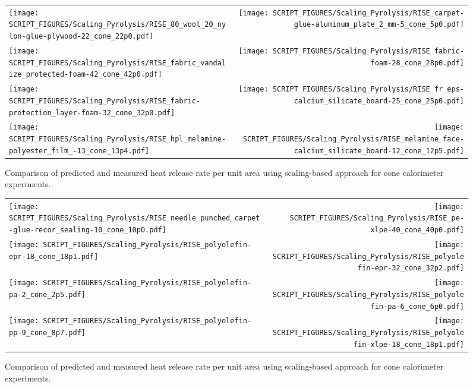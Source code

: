 \begin{figure}[p]
\begin{tabular*}{\textwidth}{l@{\extracolsep{\fill}}r}
\texttt{[image: SCRIPT\_FIGURES/Scaling\_Pyrolysis/RISE\_80\_wool\_20\_nylon-glue-plywood-22\_cone\_22p0.pdf]} &
\texttt{[image: SCRIPT\_FIGURES/Scaling\_Pyrolysis/RISE\_carpet-glue-aluminum\_plate\_2\_mm-5\_cone\_5p0.pdf]} \\
\texttt{[image: SCRIPT\_FIGURES/Scaling\_Pyrolysis/RISE\_fabric\_vandalize\_protected-foam-42\_cone\_42p0.pdf]} &
\texttt{[image: SCRIPT\_FIGURES/Scaling\_Pyrolysis/RISE\_fabric-foam-28\_cone\_28p0.pdf]} \\
\texttt{[image: SCRIPT\_FIGURES/Scaling\_Pyrolysis/RISE\_fabric-protection\_layer-foam-32\_cone\_32p0.pdf]} &
\texttt{[image: SCRIPT\_FIGURES/Scaling\_Pyrolysis/RISE\_fr\_eps-calcium\_silicate\_board-25\_cone\_25p0.pdf]} \\
\texttt{[image: SCRIPT\_FIGURES/Scaling\_Pyrolysis/RISE\_hpl\_melamine-polyester\_film\_-13\_cone\_13p4.pdf]} &
\texttt{[image: SCRIPT\_FIGURES/Scaling\_Pyrolysis/RISE\_melamine\_face-calcium\_silicate\_board-12\_cone\_12p5.pdf]} \\
\end{tabular*}
\caption[HRRPUA of RISE Materials using scaling model , Mixtures materials]
{Comparison of predicted and measured heat release rate per unit area using scaling-based approach for cone calorimeter experiments.}
\label{RISE_Materials_HRR_Mixtures}
\end{figure}

\begin{figure}[p]
\begin{tabular*}{\textwidth}{l@{\extracolsep{\fill}}r}
\texttt{[image: SCRIPT\_FIGURES/Scaling\_Pyrolysis/RISE\_needle\_punched\_carpet-glue-recor\_sealing-10\_cone\_10p0.pdf]} &
\texttt{[image: SCRIPT\_FIGURES/Scaling\_Pyrolysis/RISE\_pe-xlpe-40\_cone\_40p0.pdf]} \\
\texttt{[image: SCRIPT\_FIGURES/Scaling\_Pyrolysis/RISE\_polyolefin-epr-18\_cone\_18p1.pdf]} &
\texttt{[image: SCRIPT\_FIGURES/Scaling\_Pyrolysis/RISE\_polyolefin-epr-32\_cone\_32p2.pdf]} \\
\texttt{[image: SCRIPT\_FIGURES/Scaling\_Pyrolysis/RISE\_polyolefin-pa-2\_cone\_2p5.pdf]} &
\texttt{[image: SCRIPT\_FIGURES/Scaling\_Pyrolysis/RISE\_polyolefin-pa-6\_cone\_6p0.pdf]} \\
\texttt{[image: SCRIPT\_FIGURES/Scaling\_Pyrolysis/RISE\_polyolefin-pp-9\_cone\_8p7.pdf]} &
\texttt{[image: SCRIPT\_FIGURES/Scaling\_Pyrolysis/RISE\_polyolefin-xlpe-18\_cone\_18p1.pdf]} \\
\end{tabular*}
\caption[HRRPUA of RISE Materials using scaling model , Mixtures materials]
{Comparison of predicted and measured heat release rate per unit area using scaling-based approach for cone calorimeter experiments.}
\label{RISE_Materials_HRR_Mixtures}
\end{figure}

